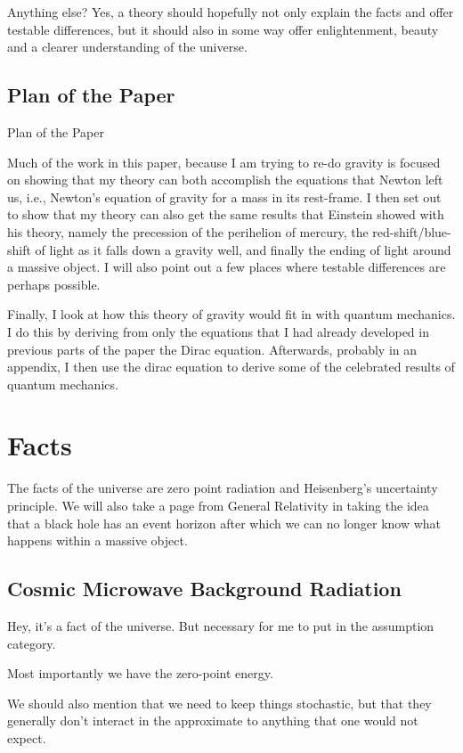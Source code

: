 \documentclass {article}
\begin{document}
		Anything else? Yes, a theory should hopefully not only explain the facts and offer testable differences, but it should also in some way offer enlightenment, beauty and a clearer understanding of the universe. 

\subsection{Plan of the Paper}
Plan of the Paper

Much of the work in this paper, because I am trying to re-do gravity is focused on showing that my theory can both accomplish the equations that Newton left us, i.e., Newton’s equation of gravity for a mass in its rest-frame. I then set out to show that my theory can also get the same results that Einstein showed with his theory, namely the precession of the perihelion of mercury, the red-shift/blue-shift of light as it falls down a gravity well, and finally the ending of light around a massive object. I will also point out a few places where testable differences are perhaps possible.

Finally, I look at how this theory of gravity would fit in with quantum mechanics. I do this by deriving from only the equations that I had already developed in previous parts of the paper the Dirac equation. Afterwards, probably in an appendix, I then use the dirac equation to derive some of the celebrated results of quantum mechanics.

\section{Facts}
	
	The facts of the universe are zero point radiation and Heisenberg’s uncertainty principle. We will also take a page from General Relativity in taking the idea that a black hole has an event horizon after which we can no longer know what happens within a massive object.
	
\subsection{Cosmic Microwave Background Radiation}


Hey, it’s a fact of the universe. But necessary for me to put in the assumption category. 

Most importantly we have the zero-point energy. 

We should also mention that we need to keep things stochastic, but that they generally don’t interact in the approximate to anything that one would not expect.
\end{document}
